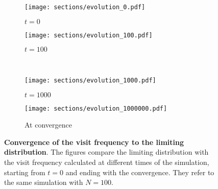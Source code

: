 \begin{figure}
  \begin{subfigure}{.5\textwidth}
      \centering
      \texttt{[image: sections/evolution\_0.pdf]}
      \caption{$t = 0$}
    \end{subfigure}
    \begin{subfigure}{.5\textwidth}
      \centering
      \texttt{[image: sections/evolution\_100.pdf]}
      \caption{$t = 100$}
    \end{subfigure}\\
    \begin{subfigure}{0.5\textwidth}
      \centering
      \texttt{[image: sections/evolution\_1000.pdf]}
      \caption{$t = 1000$}
    \end{subfigure}%
    \begin{subfigure}{0.5\textwidth}
      \centering
      \texttt{[image: sections/evolution\_1000000.pdf]}
      \caption{At convergence}
    \end{subfigure}

  \captionsetup{width=.9\linewidth}
  \caption{\textbf{Convergence of the visit frequency to the limiting distribution}. The figures compare the limiting distribution with the visit frequency calculated at different times of the simulation, starting from $t = 0$ and ending with the convergence. They refer to the same simulation with $N = 100$.}
  \label{fig:evolution}
\end{figure}


